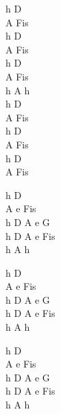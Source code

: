 \begin{chord}
    h D\\
    A Fis\\
    h D\\
    A Fis\\
    h D\\
    A Fis\\
    h A h\\
    h D\\
    A Fis\\
    h D\\
    A Fis\\
    h D\\
    A Fis

    h D\\
    A e Fis\\
    h D A e G\\
    h D A e Fis\\
    h A h

    h D\\
    A e Fis\\
    h D A e G\\
    h D A e Fis\\
    h A h

    h D\\
    A e Fis\\
    h D A e G\\
    h D A e Fis\\
    h A h
\end{chord}
